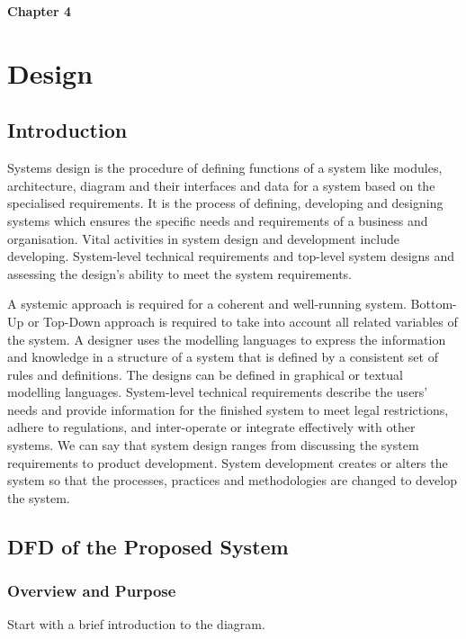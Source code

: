 \documentclass[12pt,a4paper]{article}
\begin{document}
\newpage
{\Large\bfseries\color{RoyalBlue}Chapter 4}
\vspace{0.8em}
\section{Design}
\vspace{0.6em}
\subsection{Introduction}
Systems design is the procedure of defining functions of a system like modules, architecture, diagram and their interfaces and data for a system based on the specialised requirements. It is the process of defining, developing and designing systems which ensures the specific needs and requirements of a business and organisation. Vital activities in system design and development include developing. System-level technical requirements and top-level system designs and assessing the design's ability to meet the system requirements.

A systemic approach is required for a coherent and well-running system. Bottom-Up or Top-Down approach is required to take into account all related variables of the system. A designer uses the modelling languages to express the information and knowledge in a structure of a system that is defined by a consistent set of rules and definitions. The designs can be defined in graphical or textual modelling languages. System-level technical requirements describe the users' needs and provide information for the finished system to meet legal restrictions, adhere to regulations, and inter-operate or integrate effectively with other systems. We can say that system design ranges from discussing the system requirements to product development. System development creates or alters the system so that the processes, practices and methodologies are changed to develop the system.

\subsection{DFD of the Proposed System}

\subsubsection{Overview and Purpose}
Start with a brief introduction to the diagram.
\end{document}

